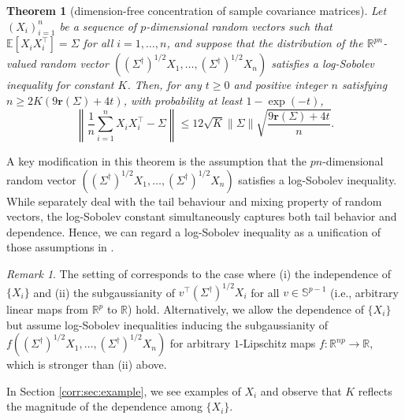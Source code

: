 \documentclass[11pt,a4paper]{article}
\newtheorem{theorem}{Theorem}%
\theoremstyle{remark}
\newtheorem{remark}{Remark}
\theoremstyle{definition}
\newcommand{\bX}{X}
\newcommand{\bv}{v}
\newcommand{\bSigma}{\Sigma}
\newcommand{\bbS}{\mathbb{S}}
\newcommand{\R}{\mathbb{R}}
\newcommand{\E}{\mathbb{E}}
\newcommand{\er}{\mathbf{r}}
\theoremstyle{definition}
\begin{document}
\begin{bibunit}[apalike]
\begin{theorem}[dimension-free concentration of sample covariance matrices]\label{thm:concentration}
    Let $(\bX_{i})_{i=1}^{n}$ be a sequence of $p$-dimensional random vectors such that $\E[\bX_{i}\bX_{i}^{\top}]=\bSigma$ for all $i=1,\ldots,n$, and suppose that the distribution of the $\R^{pn}$-valued random vector $((\bSigma^{\dagger})^{1/2}\bX_{1},\ldots,(\bSigma^{\dagger})^{1/2}\bX_{n})$ satisfies a log-Sobolev inequality for constant $K$.
    Then, for any $t\ge0$ and positive integer $n$ satisfying $n\ge 2K(9\er(\bSigma)+4t)$, with probability at least $1-\exp(-t)$,
    \begin{equation*}
        \left\|\frac{1}{n}\sum_{i=1}^{n}\bX_{i}\bX_{i}^{\top}-\bSigma\right\|\le  12\sqrt{K}\|\bSigma\|\sqrt{\frac{9\er(\bSigma)+4t}{n}}.
    \end{equation*}
\end{theorem}


A key modification in this theorem is the assumption that the $pn$-dimensional random vector $((\bSigma^{\dagger})^{1/2}\bX_{1},\ldots,(\bSigma^{\dagger})^{1/2}\bX_{n})$ satisfies a log-Sobolev inequality.
While \citet{nakakita2024dimension} separately deal with the tail behaviour and mixing property of random vectors, the log-Sobolev constant simultaneously captures both tail behavior and dependence.
Hence, we can regard a log-Sobolev inequality as a unification of those assumptions in \citet{nakakita2024dimension}.

\begin{remark}
    The setting of \citet{zhivotovskiy2024dimension} corresponds to the case where (i) the independence of $\{\bX_{i}\}$ and (ii) 
    the subgaussianity of $\bv^{\top}(\bSigma^{\dagger})^{1/2}\bX_{i}$
    for all $\bv\in\bbS^{p-1}$ (i.e., arbitrary linear maps from $\R^{p}$ to $\R$) hold. 
    Alternatively, we allow the dependence of $\{\bX_{i}\}$ but assume log-Sobolev inequalities inducing the subgaussianity of $f((\bSigma^{\dagger})^{1/2}\bX_{1},\ldots,(\bSigma^{\dagger})^{1/2}\bX_{n})$ for arbitrary $1$-Lipschitz maps $f:\R^{np}\to\R$, which is stronger than (ii) above.
\end{remark}

In Section \ref{corr:sec:example}, we see examples of $\bX_{i}$ and observe that $K$ reflects the magnitude of the dependence among $\{\bX_{i}\}$.



\end{bibunit}
\end{document}
